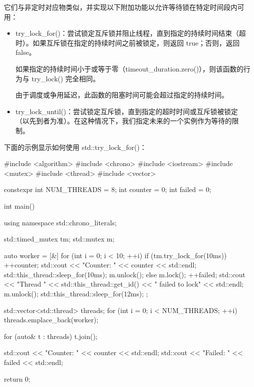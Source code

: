它们与非定时对应物类似，并实现以下附加功能以允许等待锁在特定时间段内可用：

\begin{itemize}
\item
try\_lock\_for()：尝试锁定互斥锁并阻止线程，直到指定的持续时间结束（超时）。如果互斥锁在指定的持续时间之前被锁定，则返回 true；否则，返回 false。

如果指定的持续时间小于或等于零（timeout\_duration.zero()），则该函数的行为与 try\_lock() 完全相同。

由于调度或争用延迟，此函数的阻塞时间可能会超过指定的持续时间。

\item
try\_lock\_until()：尝试锁定互斥锁，直到指定的超时时间或互斥锁被锁定（以先到者为准）。在这种情况下，我们指定未来的一个实例作为等待的限制。
\end{itemize}

下面的示例显示如何使用 std::try\_lock\_for()：

\begin{cpp}
#include <algorithm>
#include <chrono>
#include <iostream>
#include <mutex>
#include <thread>
#include <vector>

constexpr int NUM_THREADS = 8;
int counter = 0;
int failed = 0;

int main() {
    using namespace std::chrono_literals;

    std::timed_mutex tm;
    std::mutex m;

    auto worker = [&] {
        for (int i = 0; i < 10; ++i) {
            if (tm.try_lock_for(10ms)) {
                ++counter;
                std::cout << "Counter: " << counter << std::endl;
                std::this_thread::sleep_for(10ms);
                m.unlock();
            }
            else {
                m.lock();
                ++failed;
                std::cout << "Thread " << std::this_thread::get_id()
                << " failed to lock" << std::endl;
                m.unlock();
            }
            std::this_thread::sleep_for(12ms);
        }
    };

    std::vector<std::thread> threads;
    for (int i = 0; i < NUM_THREADS; ++i) {
        threads.emplace_back(worker);
    }

    for (auto& t : threads) {
        t.join();
    }

    std::cout << "Counter: " << counter << std::endl;
    std::cout << "Failed: " << failed << std::endl;

    return 0;
}
\end{cpp}

